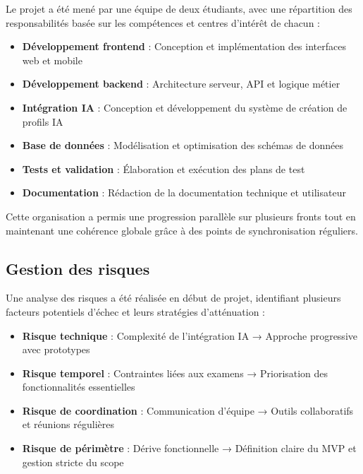 Le projet a été mené par une équipe de deux étudiants, avec une répartition des responsabilités basée sur les compétences et centres d'intérêt de chacun :

\begin{itemize}
  \item \textbf{Développement frontend} : Conception et implémentation des interfaces web et mobile
  
  \item \textbf{Développement backend} : Architecture serveur, API et logique métier
  
  \item \textbf{Intégration IA} : Conception et développement du système de création de profils IA
  
  \item \textbf{Base de données} : Modélisation et optimisation des schémas de données
  
  \item \textbf{Tests et validation} : Élaboration et exécution des plans de test
  
  \item \textbf{Documentation} : Rédaction de la documentation technique et utilisateur
\end{itemize}

Cette organisation a permis une progression parallèle sur plusieurs fronts tout en maintenant une cohérence globale grâce à des points de synchronisation réguliers.

\subsection{Gestion des risques}

Une analyse des risques a été réalisée en début de projet, identifiant plusieurs facteurs potentiels d'échec et leurs stratégies d'atténuation :

\begin{itemize}
  \item \textbf{Risque technique} : Complexité de l'intégration IA → Approche progressive avec prototypes
  
  \item \textbf{Risque temporel} : Contraintes liées aux examens → Priorisation des fonctionnalités essentielles
  
  \item \textbf{Risque de coordination} : Communication d'équipe → Outils collaboratifs et réunions régulières
  
  \item \textbf{Risque de périmètre} : Dérive fonctionnelle → Définition claire du MVP et gestion stricte du scope
\end{itemize}

